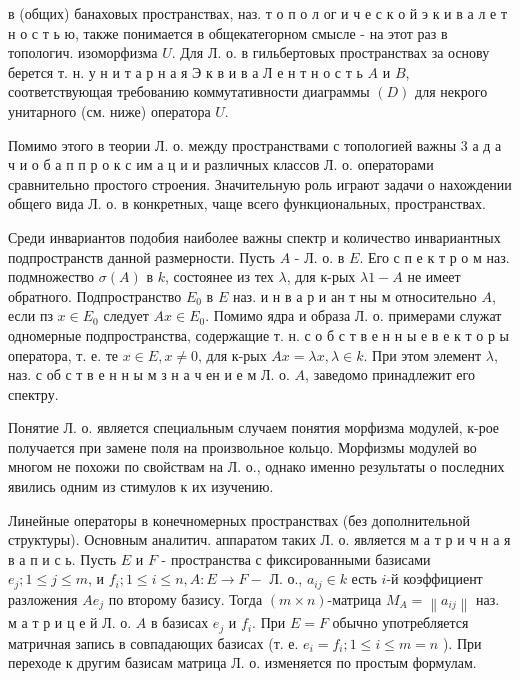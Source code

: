 \documentclass[10pt]{article}
\begin{document}
в (общих) банаховых пространствах, наз. т о п о л ог и ч е с к о й э к и в а л е т н о с т ь ю, также понимается в общекатегорном смысле - на этот раз в топологич. изоморфизма $U$. Для Л. о. в гильбертовых пространствах за основу берется т. н. у н и т а р н а я Э к в и в а Л е н т н о с т ь $A$ и $B$, соответствующая требованию коммутативности диаграммы $(D)$ для некрого унитарного (см. ниже) оператора $U$.



Помимо этого в теории Л. о. между пространствами с топологией важны 3 а д а ч и о б а п п р о к с им а ц и и различных классов Л. о. операторами сравнительно простого строения. Значительную роль играют задачи о нахождении общего вида Л. о. в конкретных, чаще всего функциональных, пространствах.



Среди инвариантов подобия наиболее важны спектр и количество инвариантных подпространств данной размерности. Пусть $A$ - Л. о. в $E$. Его с п е к т р о м наз. подмножество $\sigma(A)$ в $k$, состоянее из тех $\lambda$, для к-рых $\lambda 1-A$ не имеет обратного. Подпространство $E_{0}$ в $E$ наз. и н в а р и ан т ны м относительно $A$, если пз $x \in E_{0}$ следует $A x \in E_{0}$. Помимо ядра и образа Л. о. примерами служат одномерные подпространства, содержащие т. н. с о б с т в е н н ы е в е к т о р ы оператора, т. е. те $x \in E, x \neq 0$, для к-рых $A x=\lambda x, \lambda \in k$. При этом элемент $\lambda$, наз. с об с т в е н н ы м з н а ч ен и е м Л. о. $A$, заведомо принадлежит его спектру.



Понятие Л. о. является специальным случаем понятия морфизма модулей, к-рое получается при замене поля на произвольное кольцо. Морфизмы модулей во многом не похожи по свойствам на Л. о., однако именно результаты о последних явились одним из стимулов к их изучению.



Линейные операторы в конечномерных пространствах (без дополнительной структуры). Основным аналитич. аппаратом таких Л. о. является м а т р и ч н а я в а п и с ь. Пусть $E$ и $F$ - пространства с фиксированными базисами $e_{j} ; 1 \leqslant j \leqslant m$, и $f_{i} ; 1 \leqslant i \leqslant n, A: E \rightarrow F-$ Л. о., $a_{i j} \in k$ есть $i$-й коэффициент разложения $A e_{j}$ по второму базису. Тогда $(m \times n)$-матрица $M_{A}=\left\|a_{i j}\right\|$ наз. м а т р и ц е й Л. о. $A$ в базисах $e_{j}$ и $f_{i}$. При $E=F$ обычно употребляется матричная запись в совпадающих базисах (т. е. $e_{i}=f_{i} ; 1 \leqslant i \leqslant m=n$ ). При переходе к другим базисам матрица Л. о. изменяется по простым формулам.
\end{document}
